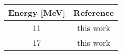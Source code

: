 \begin{tabular}{c c} 
    \toprule 
    \bf{Energy [MeV]} & \bf{Reference} \\
    \midrule
    11 & this work\\
    17 & this work\\
    \bottomrule
\end{tabular}
